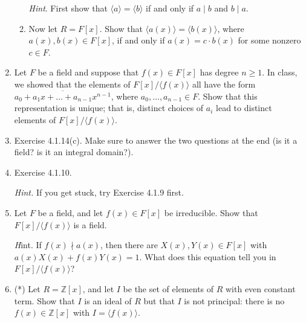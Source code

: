 \documentclass[11pt]{article}
\def\Z{\mathbb{Z}}
\theoremstyle{plain}
\theoremstyle{remark}
\begin{document}
\begin{enumerate}
\begin{enumerate}
{\scriptsize \emph{Hint}. First show that $\langle a\rangle = \langle b\rangle$ if and only if $a\mid b$ and $b\mid a$.}
\item Now let $R=F[x]$. Show that $\langle a(x)\rangle = \langle b(x)\rangle$, where $a(x), b(x) \in F[x]$, if and only if $a(x) = c\cdot b(x)$ for some nonzero $c \in F$.
\end{enumerate}

\item Let $F$ be a field and suppose that $f(x)\in F[x]$ has degree $n\ge 1$. In class, we showed that the elements of $F[x]/\langle f(x)\rangle$ all have the form $\overline{a_0 + a_1 x + \dots + a_{n-1} x^{n-1}}$, where $a_0, \dots, a_{n-1} \in F$. Show that this representation is unique; that is, distinct choices of $a_i$ lead to distinct elements of $F[x]/\langle f(x)\rangle$.


\item Exercise 4.1.14(c). Make sure to answer the two questions at the end (is it a field? is it an integral domain?).

\item Exercise 4.1.10. 

{\scriptsize \emph{Hint.} If you get stuck, try Exercise 4.1.9 first.}

\item Let $F$ be a field, and let $f(x) \in F[x]$ be irreducible. Show that $F[x]/\langle f(x)\rangle$ is a field. 

{\scriptsize {\emph Hint}. If $f(x) \nmid a(x)$, then there are $X(x), Y(x) \in F[x]$ with $a(x) X(x) + f(x) Y(x)=1$. What does this equation tell you in $F[x]/\langle f(x)\rangle$?}

\item (*) Let $R = \Z[x]$, and let $I$ be the set of elements of $R$ with even constant term. Show that $I$ is an ideal of $R$ but that $I$ is not principal: there is no $f(x) \in \Z[x]$ with $I = \langle f(x) \rangle$.

\end{enumerate}
\end{document}
